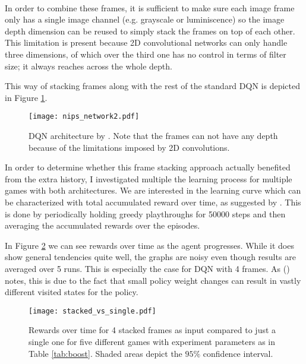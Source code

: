 \paragraph{}
In order to combine these frames,
it is sufficient to make sure each image frame only has a single image channel
(e.g. grayscale or luminiscence)
so the image depth dimension can be reused
to simply stack the frames on top of each other.
This limitation is present because 2D convolutional networks
can only handle three dimensions,
of which over the third one has no control in terms of filter size;
it always reaches across the whole depth.

This way of stacking frames along with the rest of the standard DQN
is depicted in Figure \ref{fig:nips_network2}.

\begin{figure}[htpb]
  \centering
  \texttt{[image: nips\_network2.pdf]}
  \caption[DQN architecture]{
    DQN architecture by \cite{Mnih2013}.
    Note that the frames can not have any depth because of
    the limitations imposed by 2D convolutions.
  }
  \label{fig:nips_network2}
\end{figure}

In order to determine
whether this frame stacking approach
actually benefited from the extra history,
I investigated multiple
the learning process for multiple games
with both architectures.
We are interested in the learning curve
which can be characterized with
total accumulated reward over time,
as suggested by \citeauthor{Bellemare2015} \citeyear{Bellemare2015}.
This is done by periodically
holding greedy playthroughs for 50000 steps
and then averaging the accumulated rewards
over the episodes.

In Figure \ref{fig:stacked_vs_single_rewards}
we can see rewards over time as the agent progresses.
While it does show general tendencies quite well,
the graphs are noisy even though results are averaged over 5 runs.
This is especially the case for DQN with 4 frames.
As \citeauthor{Mnih2013} (\citeyear{Mnih2013}) notes,
this is due to the fact that small policy weight changes
can result in vastly different visited states for the policy.

\begin{figure}[htpb]
  \centering
  \texttt{[image: stacked\_vs\_single.pdf]}
  \caption[DQN reward over time]{
    Rewards over time for 4 stacked frames as input
    compared to just a single one
    for five different games
    with experiment parameters as in Table \ref{tab:boost}.
    Shaded areas depict the $95\%$ confidence interval.
  }
  \label{fig:stacked_vs_single_rewards}
\end{figure}

